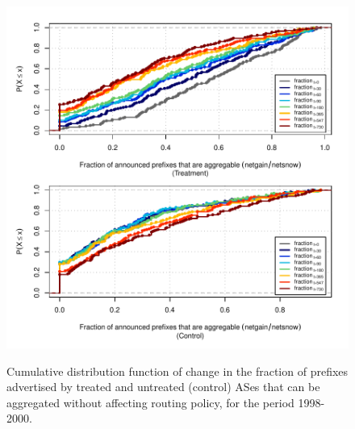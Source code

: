 \clearpage
\vspace*{16pt}
\begin{figure}[H]
\begin{centering}
\begin{singlespace}
\captionsetup{list=no}
    \includegraphics[width=6in]{figures/behavior-frac_deagg-1998_2000-corr.pdf}
    \vspace{-2em}\\
    \caption{Cumulative distribution function of change in the fraction of
    prefixes advertised by treated and untreated (control) ASes that can be
    aggregated without affecting routing policy, for the period 1998-2000.}
\end{singlespace}
\end{centering}
\end{figure}

